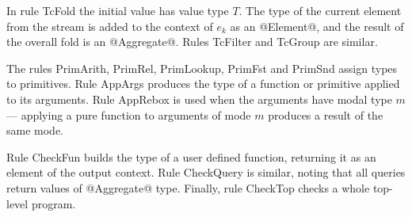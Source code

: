 In rule TcFold the initial value has value type $T$. The type of the current element from the stream is added to the context of $e_k$ as an @Element@, and the result of the overall fold is an @Aggregate@. Rules TcFilter and TcGroup are similar.



The rules PrimArith, PrimRel, PrimLookup, PrimFst and PrimSnd assign types to primitives.
Rule AppArgs produces the type of a function or primitive applied to its arguments.
Rule AppRebox is used when the arguments have modal type $m$ --- applying a pure function to arguments of mode $m$ produces a result of the same mode.

Rule CheckFun builds the type of a user defined function, returning it as an element of the output context. Rule CheckQuery is similar, noting that all queries return values of @Aggregate@ type. Finally, rule CheckTop checks a whole top-level program.




